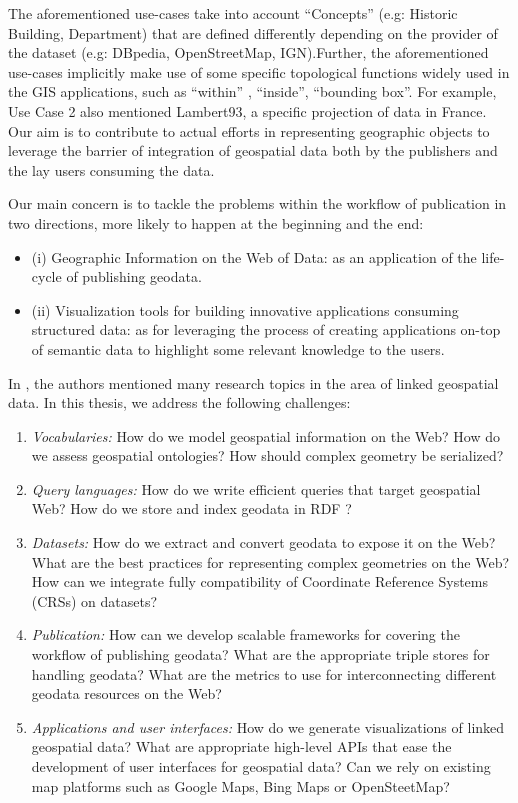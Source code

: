 The aforementioned use-cases take into account ``Concepts'' (e.g: Historic Building, Department) that are defined differently depending on the provider of the dataset (e.g: DBpedia, OpenStreetMap, IGN).Further, the aforementioned use-cases implicitly make use of some specific topological functions widely used in the GIS applications, such as ``within'' , ``inside'', ``bounding box''. For example, Use Case 2 also mentioned Lambert93, a specific projection of data in France. Our aim is to contribute to actual efforts in representing geographic objects to leverage the barrier of integration of geospatial data both by the publishers and the lay users consuming the data.

Our main concern is to tackle the problems within the workflow of publication in two directions, more likely to happen at the beginning and the end:
\begin{itemize}
 \item (i) Geographic Information on the Web of Data: as an application of the life-cycle of publishing geodata.
 \item (ii) Visualization tools for building innovative applications consuming structured data: as for leveraging the process of creating applications on-top of semantic data to highlight some relevant knowledge to the users.
\end{itemize}

In \cite{koubarakis12}, the authors mentioned many research topics in the area of linked geospatial data. In this thesis, we address the following challenges:

\begin{enumerate}

\item \textit{Vocabularies:} How do we model geospatial information on the Web? How do we assess geospatial ontologies? How should complex geometry be serialized?
\item \textit{Query languages:} How do we write efficient queries that target geospatial Web? How do we store and index geodata in RDF ?
\item \textit{Datasets:} How do we extract and convert geodata to expose it on the Web? What are the best practices for representing complex geometries on the Web? How can we integrate fully compatibility of Coordinate Reference Systems (CRSs) on datasets?
\item \textit{Publication:} How can we develop scalable frameworks for covering the workflow of publishing geodata? What are the appropriate triple stores for handling geodata? What are the metrics to use for interconnecting different geodata resources on the Web?
\item \textit{Applications and user interfaces:} How do we generate visualizations of linked geospatial data? What are appropriate high-level APIs that ease the development of user interfaces for geospatial data? Can we rely on existing map platforms such as Google Maps, Bing Maps or OpenSteetMap?
\end{enumerate}

